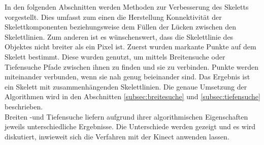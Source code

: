 In den folgenden Abschnitten werden Methoden zur Verbesserung des Skeletts vorgestellt. Dies umfasst zum einen die Herstellung Konnektivität der Skelettkomponenten beziehungsweise dem Füllen der Lücken zwischen den Skelettlinien. Zum anderen ist es wünschenswert, dass die Skelettlinie des Objektes nicht breiter als ein Pixel ist. Zuerst wurden markante Punkte auf dem Skelett bestimmt. Diese wurden
genutzt, um mittels Breitensuche oder Tiefensuche Pfade zwischen ihnen zu finden und sie zu verbinden. Punkte werden miteinander
verbunden, wenn sie nah genug beieinander sind. Das Ergebnis ist ein Skelett mit
zusammenhängenden Skelettlinien. Die genaue Umsetzung der Algorithmen wird in den Abschnitten \ref{subsec:breitesuche} und \ref{subsec:tiefensuche} beschrieben.\\
Breiten -und Tiefensuche liefern aufgrund ihrer algorithmischen Eigenschaften jeweils unterschiedliche Ergebnisse. Die Unterschiede werden gezeigt und es wird diskutiert, inwieweit sich die Verfahren mit der Kinect anwenden lassen. 
\newpage

